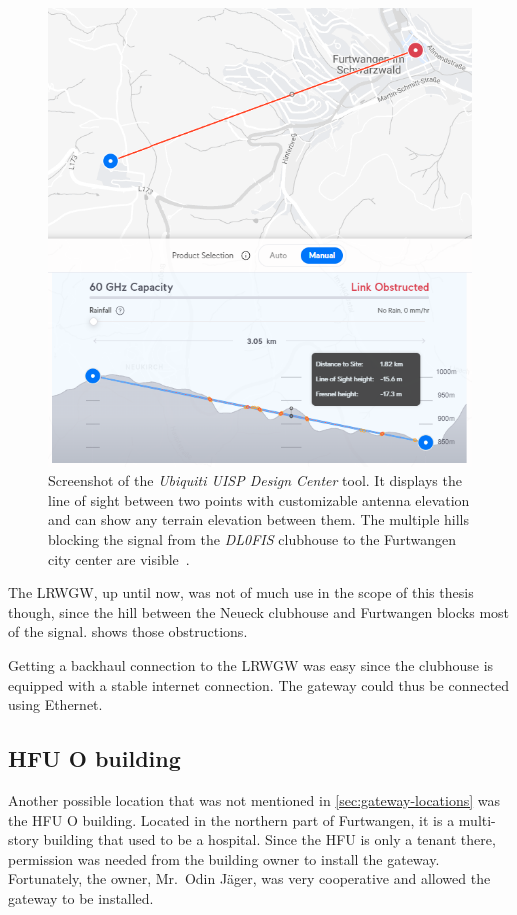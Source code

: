 \begin{figure}[htbp]
    \centering
    \includegraphics[width=.6\textwidth]{pictures/hardware/gateway-deployment/line-of-sight-dl0fis.png}
    \caption{
        Screenshot of the \emph{Ubiquiti UISP Design Center} tool.
        It displays the line of sight between two points with customizable antenna elevation and can show any terrain elevation between them.
        The multiple hills blocking the signal from the \emph{DL0FIS} clubhouse to the Furtwangen city center are visible~\cite{ubiquiti_inc_uisp_2023}.
    }\label{pic:dl0fis_gw_los}
\end{figure}
    
The \acl{LRWGW}, up until now, was not of much use in the scope of this thesis though, since the hill between the Neueck clubhouse and Furtwangen blocks most of the signal.
 shows those obstructions.

Getting a backhaul connection to the \acl{LRWGW} was easy since the clubhouse is equipped with a stable internet connection.
The gateway could thus be connected using Ethernet.

\subsection{\acl{HFU} O building}\label{subsec:conclusion-hfu-o-building}

Another possible location that was not mentioned in \cref{sec:gateway-locations} was the \ac{HFU} O building.
Located in the northern part of Furtwangen, it is a multi-story building that used to be a hospital.
Since the \ac{HFU} is only a tenant there, permission was needed from the building owner to install the gateway.
Fortunately, the owner, Mr.\ Odin Jäger, was very cooperative and allowed the gateway to be installed.

